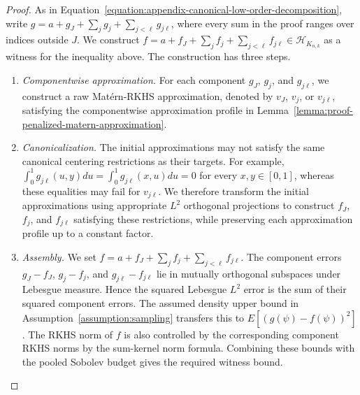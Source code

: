 \documentclass[letterpaper,12pt]{article}
\theoremstyle{definition}
\numberwithin{equation}{section}
\newcommand{\mc}{\mathcal}
\begin{document}
\begin{proof}
As in Equation~\eqref{equation:appendix-canonical-low-order-decomposition}, write $g=a+g_J+\sum_jg_j+\sum_{j<\ell}g_{j\ell}$, where every sum in the proof ranges over indices outside $J$.
We construct $f=a+f_J+\sum_jf_j+\sum_{j<\ell}f_{j\ell}\in\mc H_{K_{n,k}}$ as a witness for the inequality above.
The construction has three steps.
\begin{enumerate}
\item \emph{Componentwise approximation.} For each component $g_J$, $g_j$, and $g_{j\ell}$, we construct a raw Mat\'ern-RKHS approximation, denoted by $v_J$, $v_j$, or $v_{j\ell}$, satisfying the componentwise approximation profile in Lemma~\ref{lemma:proof-penalized-matern-approximation}.
\item \emph{Canonicalization.} The initial approximations may not satisfy the same canonical centering restrictions as their targets. For example, $\int_0^1g_{j\ell}(u,y)du=\int_0^1g_{j\ell}(x,u)du=0$ for every $x,y\in[0,1]$, whereas these equalities may fail for $v_{j\ell}$. We therefore transform the initial approximations using appropriate $L^2$ orthogonal projections to construct $f_J$, $f_j$, and $f_{j\ell}$ satisfying these restrictions, while preserving each approximation profile up to a constant factor.
\item \emph{Assembly.} We set $f=a+f_J+\sum_jf_j+\sum_{j<\ell}f_{j\ell}$. The component errors $g_J-f_J$, $g_j-f_j$, and $g_{j\ell}-f_{j\ell}$ lie in mutually orthogonal subspaces under Lebesgue measure. Hence the squared Lebesgue $L^2$ error is the sum of their squared component errors.
The assumed density upper bound in Assumption~\ref{assumption:sampling} transfers this to $E[(g(\psi)-f(\psi))^2]$. The RKHS norm of $f$ is also controlled by the corresponding component RKHS norms by the sum-kernel norm formula. Combining these bounds with the pooled Sobolev budget gives the required witness bound.
\end{enumerate}


\end{proof}
\end{document}

